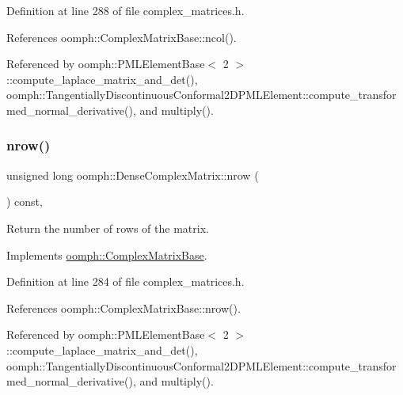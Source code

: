 Definition at line 288 of file complex\+\_\+matrices.\+h.



References oomph\+::\+Complex\+Matrix\+Base\+::ncol().



Referenced by oomph\+::\+P\+M\+L\+Element\+Base$<$ 2 $>$\+::compute\+\_\+laplace\+\_\+matrix\+\_\+and\+\_\+det(), oomph\+::\+Tangentially\+Discontinuous\+Conformal2\+D\+P\+M\+L\+Element\+::compute\+\_\+transformed\+\_\+normal\+\_\+derivative(), and multiply().

\mbox{\label{classoomph_1_1DenseComplexMatrix_aea9edba37ef5fd679d17f22eaeb85369}} 
\subsubsection{\texorpdfstring{nrow()}{nrow()}}
{\footnotesize\ttfamily unsigned long oomph\+::\+Dense\+Complex\+Matrix\+::nrow (\begin{DoxyParamCaption}{ }\end{DoxyParamCaption}) const\hspace{0.3cm}{\ttfamily [inline]}, {\ttfamily [virtual]}}



Return the number of rows of the matrix. 



Implements \hyperlink{classoomph_1_1ComplexMatrixBase_adcbdf19bc82c61c0a4fbfd8c8de97b3b}{oomph\+::\+Complex\+Matrix\+Base}.



Definition at line 284 of file complex\+\_\+matrices.\+h.



References oomph\+::\+Complex\+Matrix\+Base\+::nrow().



Referenced by oomph\+::\+P\+M\+L\+Element\+Base$<$ 2 $>$\+::compute\+\_\+laplace\+\_\+matrix\+\_\+and\+\_\+det(), oomph\+::\+Tangentially\+Discontinuous\+Conformal2\+D\+P\+M\+L\+Element\+::compute\+\_\+transformed\+\_\+normal\+\_\+derivative(), and multiply().

\mbox{\label{classoomph_1_1DenseComplexMatrix_ad59f7b0bbbbce05868a80fcfd3f08560}} 
